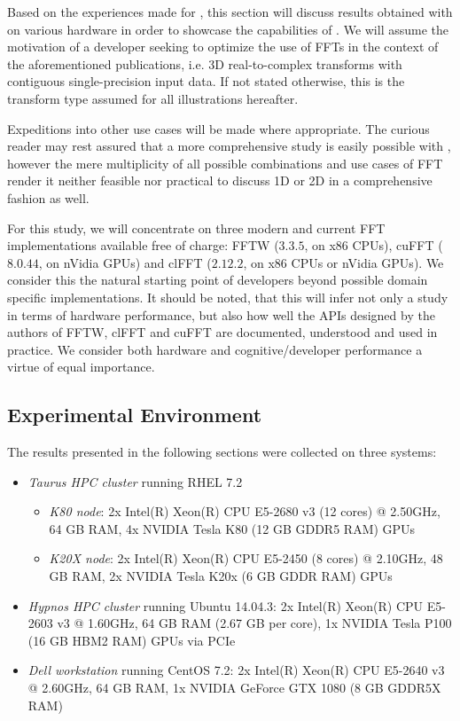 Based on the experiences made for \cite{preibisch2014efficient, schmid2015real}, this section will discuss results obtained with \gearshifft{} on various hardware in order to showcase the capabilities of \gearshifft{}. We will assume the motivation of a developer seeking to optimize the use of FFTs in the context of the aforementioned publications, i.e. 3D real-to-complex transforms with contiguous single-precision input data. If not stated otherwise, this is the transform type assumed for all illustrations hereafter. 

Expeditions into other use cases will be made where appropriate. The curious reader may rest assured that a more comprehensive study is easily possible with \gearshifft{}, however the mere multiplicity of all possible combinations and use cases of FFT render it neither feasible nor practical to discuss 1D or 2D in a comprehensive fashion as well.

For this study, we will concentrate on three modern and current FFT implementations available free of charge: FFTW ($3.3.5$, on x86 CPUs), cuFFT ($8.0.44$, on nVidia GPUs) and clFFT ($2.12.2$, on x86 CPUs or nVidia GPUs). We consider this the natural starting point of developers beyond possible domain specific implementations. It should be noted, that this will infer not only a study in terms of hardware performance, but also how well the APIs designed by the authors of FFTW, clFFT and cuFFT are documented, understood and used in practice. We consider both hardware and cognitive/developer performance a virtue of equal importance.

\subsection{Experimental Environment}
\label{ssec:env}

The results presented in the following sections were collected on three systems:

\begin{itemize}
\item \emph{Taurus HPC cluster}\cite{taurus} running RHEL 7.2
  \begin{itemize}
  \item \emph{K80 node}: 2x Intel(R) Xeon(R) CPU E5-2680 v3 (12 cores) @ 2.50GHz, 64 GB RAM, 4x NVIDIA Tesla K80 (12 GB GDDR5 RAM) GPUs 
  \item \emph{K20X node}: 2x Intel(R) Xeon(R) CPU E5-2450 (8 cores) @ 2.10GHz, 48 GB RAM, 2x NVIDIA Tesla K20x (6 GB GDDR RAM) GPUs 
  \end{itemize}
\item \emph{Hypnos HPC cluster}\cite{hypnos} running Ubuntu 14.04.3:\newline
  2x Intel(R) Xeon(R) CPU E5-2603 v3 @ 1.60GHz, 64 GB RAM (2.67 GB per core), 1x NVIDIA Tesla P100 (16 GB HBM2 RAM) GPUs via PCIe 
\item  \emph{Dell workstation} running CentOS 7.2:\newline 
  2x Intel(R) Xeon(R) CPU E5-2640 v3 @ 2.60GHz, 64 GB RAM, 1x NVIDIA GeForce GTX 1080 (8 GB GDDR5X RAM)
\end{itemize}

